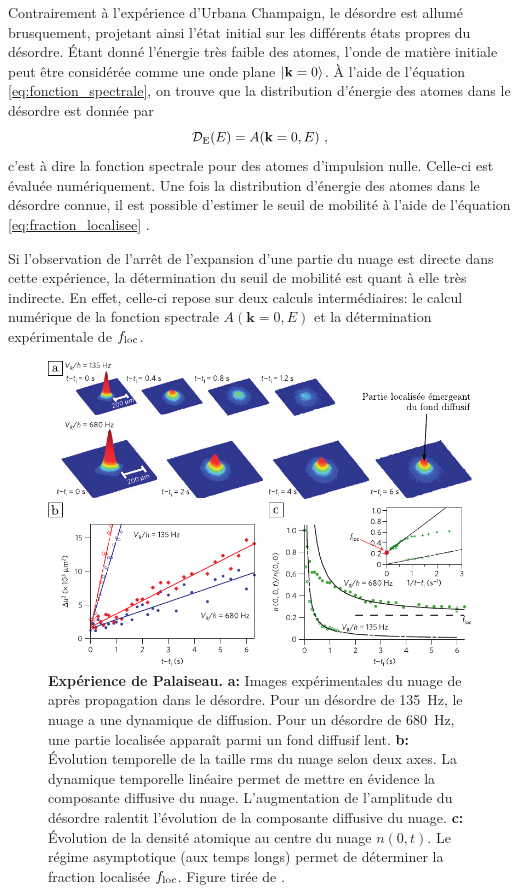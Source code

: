 Contrairement à l'expérience d'Urbana Champaign, le désordre est allumé brusquement, projetant ainsi l'état initial sur les différents états propres du désordre. Étant donné l'énergie très faible des atomes, l'onde de matière initiale peut être considérée comme une onde plane $\left| \mathbf{k}=0 \right\rangle$. À l'aide de l'équation \ref{eq:fonction_spectrale}, on trouve que la distribution d'énergie des atomes dans le désordre est donnée par 
\begin{equation}
\mathcal{D}_{\mathrm{E}}(E) = A(\mathbf{k}=0,E) \text{ ,}
\end{equation}
c'est à dire la fonction spectrale pour des atomes d'impulsion nulle. Celle-ci est évaluée numériquement. Une fois la distribution d'énergie des atomes dans le désordre connue, il est possible d'estimer le seuil de mobilité à l'aide de l'équation \ref{eq:fraction_localisee} \citep{piraud2012localisation}.

Si l'observation de l'arrêt de l'expansion d'une partie du nuage est directe dans cette expérience, la détermination du seuil de mobilité est quant à elle très indirecte. En effet, celle-ci repose sur deux calculs intermédiaires: le calcul numérique de la fonction spectrale $A(\mathbf{k}=0,E)$ et la détermination expérimentale de $f_{\mathrm{loc}}$. 



\begin{figure}
\centering
\includegraphics[width=\textwidth]{Fig/Localisation/experience_palaiseau.pdf}
\caption{\textbf{Expérience de Palaiseau.} \textbf{a:} Images expérimentales du nuage de  après propagation dans le désordre. Pour un désordre de \SI{135}{\hertz}, le nuage a une dynamique de diffusion. Pour un désordre de \SI{680}{\hertz}, une partie localisée apparaît parmi un fond diffusif lent. \textbf{b:} Évolution temporelle de la taille rms du nuage selon deux axes. La dynamique temporelle linéaire permet de mettre en évidence la composante diffusive du nuage. L'augmentation de l'amplitude du désordre ralentit l'évolution de la composante diffusive du nuage. \textbf{c:} Évolution de la densité atomique au centre du nuage $n(0,t)$. Le régime asymptotique (aux temps longs) permet de déterminer la fraction localisée $f_{\mathrm{loc}}$. Figure tirée de \citep{jendrzejewski2012three}.}
\label{fig:experience_palaiseau}
\end{figure}


